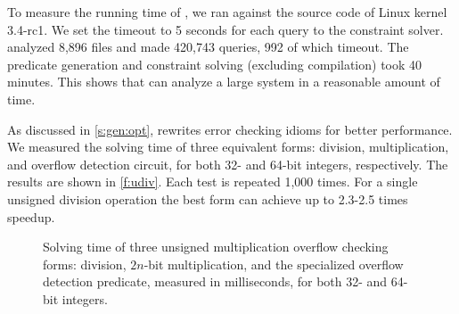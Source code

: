To measure the running time of \sys, we ran \sys against the source
code of Linux kernel 3.4-rc1.  We set the timeout
to 5 seconds for each query to the constraint solver.   \sys analyzed
8,896 files and made 420,743 queries, 992 of which timeout.
The predicate generation and constraint solving (excluding compilation)
took 40 minutes.  This shows that \sys can analyze a large
system in a reasonable amount of time.

As discussed in \autoref{s:gen:opt}, \sys rewrites error checking
idioms for better performance.  We measured the solving time of three
equivalent forms: division, multiplication, and overflow detection
circuit, for both 32- and 64-bit integers, respectively.  The results
are shown in \autoref{f:udiv}.  Each test is repeated 1,000 times.
For a single unsigned division operation the best form can
achieve up to 2.3-2.5 times speedup.

\begin{figure}
\centering

\caption{Solving time of three unsigned multiplication overflow
checking forms: division, $2n$-bit multiplication, and the specialized
overflow detection predicate, measured in milliseconds, for both
32- and 64-bit integers.}
\label{f:udiv}
\end{figure}
